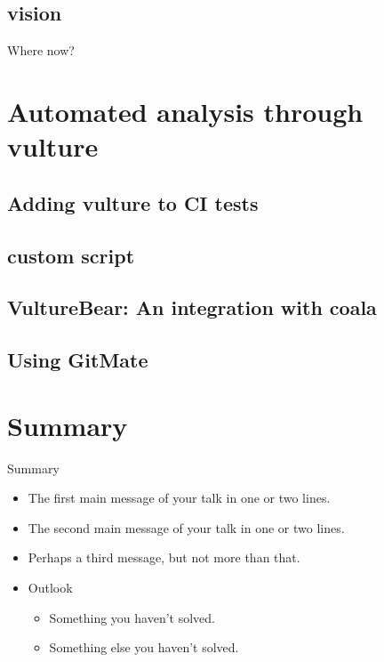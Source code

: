 \documentclass{beamer}
\begin{document}
\subsection*{vision}
\begin{frame}{Where now?}
    
\end{frame}

\section{Automated analysis through vulture}

\subsection{Adding vulture to CI tests}
\subsection{custom script}
\subsection{VultureBear: An integration with coala}
\subsection{Using GitMate}

\section*{Summary}

\begin{frame}{Summary}
  \begin{itemize}
  \item
    The \alert{first main message} of your talk in one or two lines.
  \item
    The \alert{second main message} of your talk in one or two lines.
  \item
    Perhaps a \alert{third message}, but not more than that.
  \end{itemize}
  
  \begin{itemize}
  \item
    Outlook
    \begin{itemize}
    \item
      Something you haven't solved.
    \item
      Something else you haven't solved.
    \end{itemize}
  \end{itemize}
\end{frame}
\end{document}
